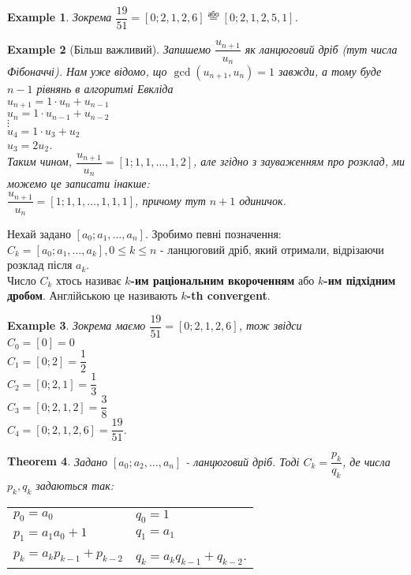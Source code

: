 \documentclass[a4paper, 14pt]{extarticle}
\theoremstyle{theoremdd}
\newtheorem{theorem}{Theorem}[subsection]
\theoremstyle{theoremdd}
\theoremstyle{theoremdd}
\theoremstyle{theoremdd}
\newtheorem{example}[theorem]{Example}
\theoremstyle{theoremdd}
\theoremstyle{theoremdd}
\theoremstyle{theoremdd}
\theoremstyle{theoremdd}
\begin{document}
\begin{example}
Зокрема $\dfrac{19}{51} = [0;2,1,2,6] \overset{\text{або}}{=} [0;2,1,2,5,1]$.
\end{example}

\begin{example}[Більш важливий]
Запишемо $\dfrac{u_{n+1}}{u_n}$  як ланцюговий дріб (тут числа Фібоначчі). Нам уже відомо, що $\gcd(u_{n+1},u_n) = 1$ завжди, а тому буде $n-1$ рівнянь в алгоритмі Евкліда\\
$u_{n+1} = 1 \cdot u_n + u_{n-1}$\\
$u_{n} = 1 \cdot u_{n-1} + u_{n-2}$\\
$\vdots$\\
$u_4 = 1 \cdot u_3 + u_2$\\
$u_3 = 2 u_2$.\\
Таким чином, $\dfrac{u_{n+1}}{u_n} = [1;1,1,\dots,1,2]$, але згідно з зауваженням про розклад, ми можемо це записати інакше:\\
$\dfrac{u_{n+1}}{u_n} = [1;1,1,\dots,1,1,1]$, причому тут $n+1$ одиничок.
\end{example}

Нехай задано $[a_0;a_1,\dots,a_n]$. Зробимо певні позначення:\\
$C_k = [a_0;a_1,\dots,a_k], 0 \leq k \leq n$ - ланцюговий дріб, який отримали, відрізаючи розклад після $a_k$.\\
Число $C_k$ хтось називає \textbf{$k$-им раціональним вкороченням} або \textbf{$k$-им підхідним дробом}. Англійською це називають \textbf{$k$-th convergent}.

\begin{example}
Зокрема маємо $\dfrac{19}{51} = [0;2,1,2,6]$, тож звідси\\
$C_0 = [0] = 0$\\
$C_1 = [0;2] = \dfrac{1}{2}$\\
$C_2 = [0;2,1] = \dfrac{1}{3}$\\
$C_3 = [0;2,1,2] = \dfrac{3}{8}$\\
$C_4 = [0;2,1,2,6] = \dfrac{19}{51}$.
\end{example}

\begin{theorem}
\label{convergent written as rational}
Задано $[a_0;a_2,\dots,a_n]$ - ланцюговий дріб. Тоді $C_k = \dfrac{p_k}{q_k}$, де числа $p_k,q_k$ задаються так:\\
\begin{tabular}{ll}
$p_0 = a_0$ & $q_0 = 1$\\
$p_1 = a_1a_0 + 1$ & $q_1 = a_1$\\
$p_k = a_kp_{k-1}+p_{k-2}$ & $q_k = a_kq_{k-1} + q_{k-2}$.
\end{tabular}
\end{theorem}
\end{document}
